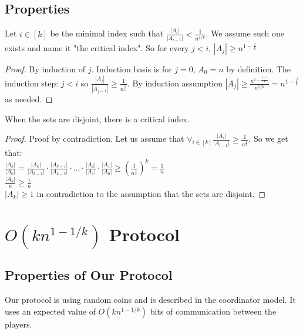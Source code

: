 \documentclass{article}
\begin{document}
\subsection{Properties}
\begin{claim}
Let $i \in [k]$ be the minimal index such that $\frac{|A_{i}|}{|A_{i-1}|} < \frac{1}{n^{1/k}}$. We assume such one exists and name it "the critical index". So for every $j < i$, $|A_j| \geq n^{1-\frac{j}{k}}$
\end{claim}
\begin{proof}
By induction of $j$. Induction basis is for $j = 0$, $A_0 = n$ by definition. The induction step: $j < i$ so $\frac{|A_{j}|}{|A_{j-1}|} \geq \frac{1}{n^{\frac{1}{k}}}$. By induction assumption $|A_{j}| \geq \frac{n^{1-\frac{j-1}{k}}}{n^{1/k}} = n^{1-\frac{j}{k}}$ as needed.
\end{proof}
\begin{claim}
When the sets are disjoint, there is a critical index.
\end{claim}
\begin{proof}
Proof by contradiction.
Let us assume that $\forall_{i\in[k]} \frac{|A_i|}{|A_{i-1}|} \geq \frac{1}{n^{\frac{1}{k}}}$. So we get that: \\
 $\frac{|A_k|}{|A_0|} = \frac{|A_k|}{|A_{k-1}|}\cdot\frac{|A_{k-1}|}{|A_{k-2}|}\cdot...\cdot\frac{|A_2|}{|A_1|}\cdot\frac{|A_1|}{|A_0|} \geq \left (  \frac{1}{n^{\frac{1}{k}}} \right )^k = \frac{1}{n} $ \\
 $ \frac{|A_k|}{n} \geq \frac{1}{n}$ \\
 $ |A_k| \geq 1$ in contradiction to the assumption that the sets are disjoint.
\end{proof}
\section{$O(kn^{1-1/k})$ Protocol}
\subsection{Properties of Our Protocol}
Our protocol is using random coins and is described in the coordinator model. It uses an expected value of $O(kn^{1-1/k})$ bits of communication between the players.
\end{document}
